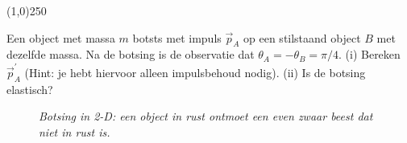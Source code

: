 \begin{center}
\line(1,0){250}
\end{center}
\begin{voorbeeld} \label{ex:bots4}
Een object met massa $m$ botsts met impuls $\vec{p}_A$ op een stilstaand object $B$ met dezelfde massa. Na
de botsing is de observatie dat $\theta_A=-\theta_B=\pi/4$. (i) Bereken $\vec{p}_A^{\prime}$ (Hint: je hebt hiervoor alleen
impulsbehoud nodig). (ii) Is de botsing elastisch?

 \begin{figure}[htbp]
\begin{center}
\caption{{\it Botsing in 2-D: een object in rust ontmoet een even zwaar beest  dat niet in rust is.}}
\label{fig:BotsVoorbeeld2}
\end{center}
\end{figure} 


\end{voorbeeld}
